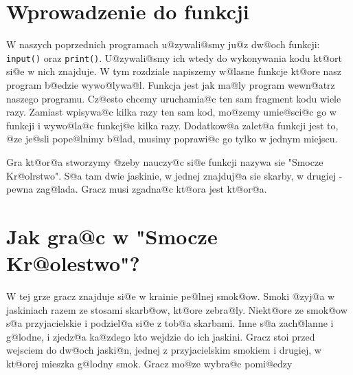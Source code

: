 \documentclass{book}
\begin{document}
\section{Wprowadzenie do funkcji}

W naszych poprzednich programach u@zywali@smy ju@z dw@och funkcji: \lstinline{input()} oraz \lstinline{print()}. U@zywali@smy ich wtedy do wykonywania kodu kt@ort si@e w nich znajduje. W tym rozdziale napiszemy w@lasne funkcje kt@ore nasz program b@edzie wywo@lywa@l. Funkcja jest jak ma@ly program wewn@atrz naszego programu. Cz@esto chcemy uruchamia@c ten sam fragment kodu wiele razy. Zamiast wpisywa@c kilka razy ten sam kod, mo@zemy umie@sci@c go w funkcji i wywo@la@c funkcj@e kilka razy. Dodatkow@a zalet@a funkcji jest to, @ze je@sli pope@lnimy b@lad, musimy poprawi@c go tylko w jednym miejscu. 

Gra kt@or@a stworzymy @zeby nauczy@c si@e funkcji nazywa sie "Smocze Kr@olrstwo". S@a tam dwie jaskinie, w jednej znajduj@a sie skarby, w drugiej - pewna zag@lada. Gracz musi zgadna@c kt@ora jest kt@or@a.

\section{Jak gra@c w "Smocze Kr@olestwo"?}

W tej grze gracz znajduje si@e w krainie pe@lnej smok@ow. Smoki @zyj@a w jaskiniach razem ze stosami skarb@ow, kt@ore zebra@ly. Niekt@ore ze smok@ow s@a przyjacielskie i podziel@a si@e z tob@a skarbami. Inne s@a zach@lanne i g@lodne, i zjedz@a ka@zdego kto wejdzie do ich jaskini. Gracz stoi przed wejsciem do dw@och jaski@n, jednej z przyjacielskim smokiem i drugiej, w kt@orej mieszka g@lodny smok. Gracz mo@ze wybra@c pomi@edzy
\end{document}
